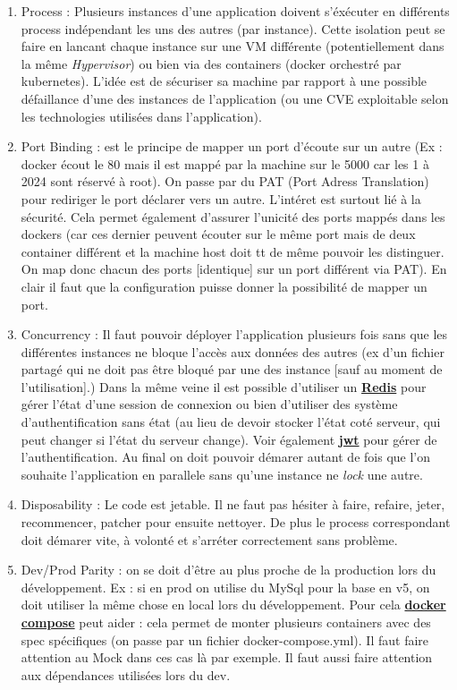 \documentclass[a4paper,12pt,twoside]{article}
\newcommand{\urlcolor}{magenta}  %
\newcommand{\keycolor}{purple} %
\newcommand{\keyref}[2]{\hypersetup{urlcolor=\keycolor} \href{#1}{\textbf{#2}}\hypersetup{urlcolor=\urlcolor}}
\begin{document}
{\begin{enumerate}
\item Process : Plusieurs instances d'une application doivent s'éxécuter en différents process indépendant les uns des autres (par instance). Cette isolation peut se faire en lancant chaque instance sur une VM différente (potentiellement dans la même \textit{Hypervisor}) ou bien via des containers (docker orchestré par kubernetes). L'idée est de sécuriser sa machine par rapport à une possible défaillance d'une des instances de l'application (ou une CVE exploitable selon les technologies utilisées dans l'application).
\item Port Binding : est le principe de mapper un port d'écoute sur un autre (Ex : docker écout le 80 mais il est mappé par la machine sur le 5000 car les 1 à 2024 sont réservé à root). On passe par du PAT (Port Adress Translation) pour rediriger le port déclarer vers un autre. L'intéret est surtout lié à la sécurité. Cela permet également d'assurer l'unicité des ports mappés dans les dockers (car ces dernier peuvent écouter sur le même port mais de deux container différent et la machine host doit tt de même pouvoir les distinguer. On map donc chacun des ports [identique] sur un port différent via PAT). En clair il faut que la configuration puisse donner la possibilité de mapper un port.
\item Concurrency : Il faut pouvoir déployer l'application plusieurs fois sans que les différentes instances ne bloque l'accès aux données des autres (ex d'un fichier partagé qui ne doit pas être bloqué par une des instance [sauf au moment de l'utilisation].) Dans la même veine il est possible d'utiliser un \keyref{https://redis.io/}{Redis} pour gérer l'état d'une session de connexion ou bien d'utiliser des système d'authentification sans état (au lieu de devoir stocker l'état coté serveur, qui peut changer si l'état du serveur change). Voir également \keyref{https://fr.wikipedia.org/wiki/JSON_Web_Token}{jwt} pour gérer de l'authentification. Au final on doit pouvoir démarer autant de fois que l'on souhaite l'application en parallele sans qu'une instance ne \textit{lock} une autre. 
\item Disposability : Le code est jetable. Il ne faut pas hésiter à faire, refaire, jeter, recommencer, patcher pour ensuite nettoyer. De plus le process correspondant doit démarer vite, à volonté et s'arréter correctement sans problème.
\item Dev/Prod Parity : on se doit d'être au plus proche de la production lors du développement. Ex : si en prod on utilise du MySql pour la base en v5, on doit utiliser la même chose en local lors du développement. Pour cela \keyref{https://docs.docker.com/compose/}{docker compose} peut aider : cela permet de monter plusieurs containers avec des spec spécifiques (on passe par un fichier docker-compose.yml). Il faut faire attention au Mock dans ces cas là par exemple. Il faut aussi faire attention aux dépendances utilisées lors du dev.

\end{enumerate}}
\end{document}

